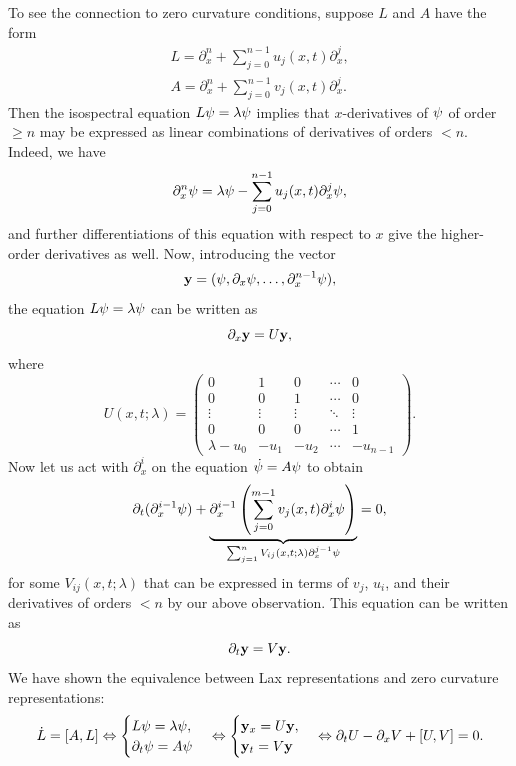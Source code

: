 \begin{example}
    To see the connection to zero curvature conditions, suppose $L$ and $A$ have the form 
    \begin{align}
        L=\partial_x^n+\sum_{j=0}^{n-1}u_j(x,t)\partial_x^j,\\
        A=\partial_x^n+\sum_{j=0}^{n-1}v_j(x,t)\partial_x^j.
    \end{align}
    Then the isospectral equation $L\bf{\psi}=\lambda\bf{\psi}$ implies that $x$-derivatives of $\bf{\psi}$ of order $\geq n$ may be expressed as linear combinations of derivatives of orders $<n$. Indeed, we have
    \[\partial_x^n\bf{\psi}=\lambda\bf{\psi}-\sum_{j=0}^{n-1}u_j(x,t)\partial_x^j\bf{\psi},\]
    and further differentiations of this equation with respect to $x$ give the higher-order derivatives as well. Now, introducing the vector 
    \[\bf{y}=(\bf{\psi},\partial_x\bf{\psi},\ldots,\partial_x^{n-1}\bf{\psi}),\]
    the equation $L\bf{\psi}=\lambda\bf{\psi}$ can be written as 
    \[\partial_x\bf{y}=U\bf{y},\]
    where 
    \[U(x,t;\lambda)=
    \begin{pmatrix}
        0 & 1 & 0 & \cdots & 0\\
        0 & 0 & 1 & \cdots & 0\\
        \vdots & \vdots & \vdots & \ddots & \vdots \\
        0 & 0 & 0 & \cdots & 1\\
        \lambda-u_0 & -u_1 & -u_2 & \cdots & -u_{n-1}
    \end{pmatrix}.
    \]
    Now let us act with $\partial_x^i$ on the equation $\dot{\bf{\psi}}=A\bf{\psi}$ to obtain 
    \[\partial_t(\partial_x^{i-1}\bf{\psi})+\underbrace{\partial_x^{i-1}\left(\sum_{j=0}^{m-1}v_j(x,t)\partial_x^i\bf{\psi}\right)}_{\sum_{j=1}^nV_{ij}(x,t;\lambda)\partial_x^{j-1}\bf{\psi}}=0,\]
    for some $V_{ij}(x,t;\lambda)$ that can be expressed in terms of $v_j$, $u_i$, and their derivatives of orders $<n$ by our above observation. This equation can be written as 
    \[\partial_t \bf{y}=V\bf{y}.\]
    We have shown the equivalence between Lax representations and zero curvature representations:
    \[
    \dot L=[A,L]\Leftrightarrow 
    \begin{cases}
        L\bf{\psi}=\lambda\bf{\psi},\\
        \partial_t\bf{\psi}=A\bf{\psi}
    \end{cases}\Leftrightarrow
    \begin{cases}
        \bf{y}_x=U\bf{y},\\
        \bf{y}_t=V\bf{y}
    \end{cases}\Leftrightarrow
    \partial_t U-\partial_x V+[U,V]=0.
    \]
\end{example}

